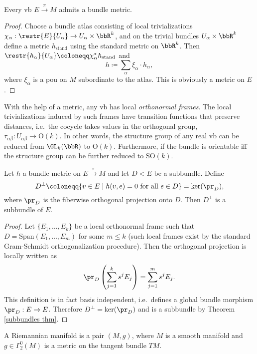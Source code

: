 \begin{thm}
Every \gls{vb} $E\overset\pi\to M$ admits a bundle metric. 
\end{thm}
\begin{proof}
Choose a bundle atlas consisting of local trivializations $\chi_\alpha:\restr{E}{U_\alpha}\to U_\alpha\times\bbR^k$, and on the trivial bundles $U_\alpha\times\bbR^k$ define a metric $h_{\text{stand}}$ using the standard metric on $\bbR^k$. Then $\restr{h_\alpha}{U_\alpha}\coloneqq \chi_\alpha^\ast h_{\text{stand}}$ and 
\[h\coloneqq \sum_\alpha \xi_\alpha \cdot h_\alpha,\]
where $\xi_\alpha$ is a \gls{pou} on $M$ subordinate to the atlas. This is obviously a metric on $E$.
\end{proof}
\begin{cor}
With the help of a metric, any \gls{vb} has local \emph{orthonormal frames}. The local trivializations induced by such frames have transition functions that preserve distances, i.e.\ the cocycle takes values in the orthogonal group, $\tau_{\alpha\beta}:U_{\alpha\beta}\to \mathrm{O}(k)$. In other words, the structure group of any real \gls{vb} can be reduced from $\GL_k(\bbR )$ to $\mathrm{O}(k)$. Furthermore, if the bundle is orientable iff the structure group can be further reduced to $\mathrm{SO}(k)$.
\end{cor}

\begin{prop}
Let $h$ a bundle metric on $E\overset\pi\to M$ and let $D< E$ be a subbundle. Define
\[D^\perp \coloneqq \{v\in E\mid h(v,e)=0 \text{ for all }e\in D\}=\ker (\pr_D),\]
where $\pr_D$ is the fiberwise orthogonal projection onto $D$. Then $D^\perp$ is a subbundle of $E$.
\end{prop}
\begin{proof}
Let $\{E_1,\ldots,E_k\}$ be a local orthonormal frame such that $D=\mathrm{Span}(E_1,\ldots,E_m)$ for some $m\leq k$ (such local frames exist by the standard Gram-Schmidt orthogonalization procedure). Then the orthogonal projection is locally written as
\[\pr_D \left(\sum_{j=1}^k s^j E_j\right)=\sum_{j=1}^m s^j E_j.\]
This definition is in fact basis independent, i.e.\ defines a global bundle morphism $\pr_D:E\to E$. Therefore $D^\perp =\ker (\pr_D)$ and is a subbundle by Theorem \ref{subbundles thm}.
\end{proof}


\begin{defn}
A Riemannian manifold is a pair $(M,g)$, where $M$ is a smooth manifold and $g\in\Gamma^0_2(M)$ is a metric on the tangent bundle $TM$.
\end{defn}



